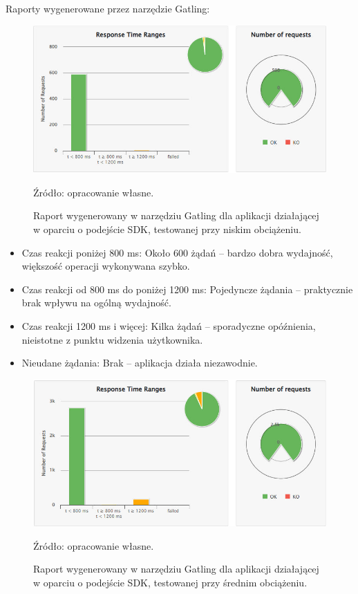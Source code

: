 \documentclass[runningheads,12pt]{llncs}
\begin{document}

Raporty wygenerowane przez narzędzie Gatling:

\begin{figure}
    \centering
    \includegraphics[width=0.8\linewidth]{images/sdk-gatling-low-graph.jpg}
    \caption{Raport wygenerowany w narzędziu Gatling dla aplikacji działającej w oparciu o podejście SDK, testowanej przy niskim obciążeniu.}
    \label{fig:low}
    \vspace{0.5em}
    {\small Źródło: opracowanie własne.}
\end{figure}

\begin{itemize}
    \item Czas reakcji poniżej 800 ms: Około 600 żądań – bardzo dobra wydajność, większość operacji wykonywana szybko.
    \item Czas reakcji od 800 ms do poniżej 1200 ms: Pojedyncze żądania – praktycznie brak wpływu na ogólną wydajność.
    \item Czas reakcji 1200 ms i więcej: Kilka żądań – sporadyczne opóźnienia, nieistotne z punktu widzenia użytkownika.
    \item Nieudane żądania: Brak – aplikacja działa niezawodnie.
\end{itemize}

\newpage

\begin{figure}
    \centering
    \includegraphics[width=0.8\linewidth]{images/sdk-gatling-middle-graph.jpg}
    \caption{Raport wygenerowany w narzędziu Gatling dla aplikacji działającej w oparciu o podejście SDK, testowanej przy średnim obciążeniu.}
    \label{fig:middle}
    \vspace{0.5em}
    {\small Źródło: opracowanie własne.}
\end{figure}
\end{document}
